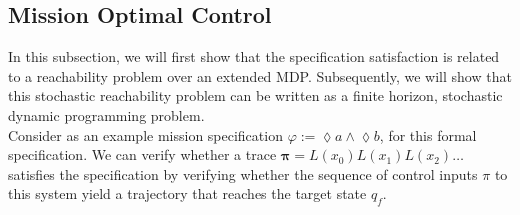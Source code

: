 \documentclass[conference]{IEEEtran}
\begin{document}
\subsection{Mission Optimal Control}
In this subsection, we will first show that the specification satisfaction is related to a reachability problem over an extended MDP. Subsequently, we will show that this stochastic reachability problem can be written as a finite horizon, stochastic dynamic programming problem.\\
Consider as an example mission specification $\varphi:= \lozenge a \wedge \lozenge b$, for this formal specification.  We can verify whether a trace $\mathbf \pi=L(x_0) L(x_1) L(x_2)\ldots $ satisfies the specification by verifying whether the sequence of control inputs $\pi$ to this system yield a trajectory that reaches the target state $q_f$.
\end{document}
